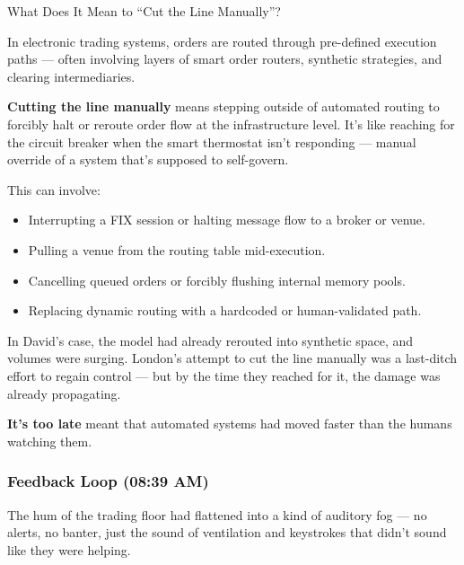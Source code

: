 \begin{TechnicalSidebar}{What Does It Mean to ``Cut the Line Manually''?}

  In electronic trading systems, orders are routed through pre-defined execution paths — often involving layers of 
  smart order routers, synthetic strategies, and clearing intermediaries. 
  
  \medskip
  
  \textbf{Cutting the line manually} means stepping outside of automated routing to forcibly halt or reroute order flow 
  at the infrastructure level. It's like reaching for the circuit breaker when the smart thermostat isn’t responding — 
  manual override of a system that's supposed to self-govern.
  
  \medskip
  
  This can involve:

  \medskip
  
  \begin{itemize}
    \item Interrupting a FIX session or halting message flow to a broker or venue.
    \item Pulling a venue from the routing table mid-execution.
    \item Cancelling queued orders or forcibly flushing internal memory pools.
    \item Replacing dynamic routing with a hardcoded or human-validated path.
  \end{itemize}
  
  \medskip
  
  In David’s case, the model had already rerouted into synthetic space, and volumes were surging.  
  London’s attempt to cut the line manually was a last-ditch effort to regain control — but by the time they reached 
  for it, the damage was already propagating.  

  \medskip
  
  \textbf{It's too late} meant that automated systems had moved faster than the humans watching them.

\end{TechnicalSidebar}
  

\medskip

\subsubsection{Feedback Loop (08:39 AM)} 

The hum of the trading floor had flattened into a kind of auditory fog — no alerts, no banter, just the sound 
of ventilation and keystrokes that didn’t sound like they were helping.


